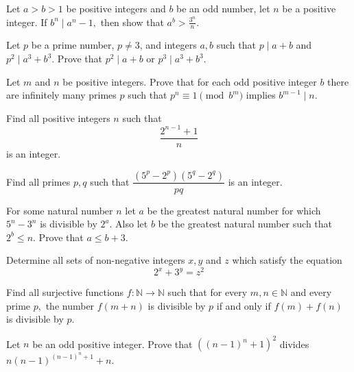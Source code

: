 \begin{problem}
	Let $ a > b > 1$ be positive integers and $b$ be an odd number, let $ n$ be a positive integer. If $ b^n \mid a^n-1,$ then show that $ a^b > \frac {3^n}{n}.$
\end{problem}

\begin{problem}
	Let $ p$ be a prime number, $ p\neq 3$, and integers $ a,b$ such that $ p\mid a + b$ and $ p^2 \mid a^3 + b^3$. Prove that $ p^2 \mid a + b$ or $ p^3 \mid a^3 + b^3$.
\end{problem}

\begin{problem}
	Let $m$ and $n$ be positive integers. Prove that for each odd positive integer $b$ there are infinitely many primes $p$ such that $p^n \equiv 1 \pmod{b^m}$ implies $b^{m-1} \mid n.$
\end{problem}

\begin{problem}
	Find all positive integers $n$ such that
	\[\frac{2^{n-1}+1}{n}\]
	is an integer.
\end{problem}

\begin{problem}
	Find all primes $p,q$ such that $\dfrac{(5^p-2^p)(5^q-2^q)}{pq}$ is an integer.
\end{problem}

\begin{problem}
	For some natural number $n$ let $a$ be the greatest natural number for which $5^{n}-3^{n}$ is divisible by $2^{a}$. Also let $b$ be the greatest natural number such that $2^{b} \leq n$. Prove that $a \leq b+3$.
\end{problem}


\begin{problem}
	Determine all sets of non-negative integers $ x, y$ and $ z$ which satisfy the equation
	\[
		2^{x}+3^{y}=z^{2}
	\]
\end{problem}

\begin{problem}
	Find all surjective functions $ f: \mathbb{N} \to \mathbb{N}$ such that for every $ m,n \in \mathbb{N}$ and every prime $ p,$ the number $ f(m + n)$ is divisible by $ p$ if and only if $ f(m)+ f(n)$ is divisible by $ p.$
\end{problem}

\begin{problem}
	Let $ n$ be an odd positive integer. Prove that $((n-1)^n+1)^2$ divides $ n(n-1)^{(n-1)^n+1}+n$.
\end{problem}

